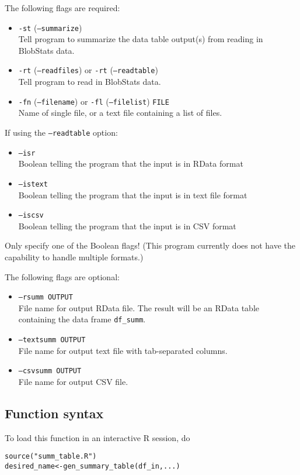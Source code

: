 \documentclass{article}
\begin{document}
The following flags are required:
\begin{itemize}
\item[] \texttt{-st} (\texttt{--summarize})\\ Tell program to summarize the data table output(s) from reading in BlobStats data.
\item[] \texttt{-rt}  (\texttt{--readfiles}) or \texttt{-rt} (\texttt{--readtable})\\ Tell program to read in BlobStats data.
\item[]\texttt{-fn} (\texttt{--filename}) or \texttt{-fl} (\texttt{--filelist}) \texttt{FILE}\\ Name of single file, or a text file containing a list of files.
\end{itemize}

If using the \texttt{--readtable} option:\begin{itemize}
\item[]\texttt{--isr}\\Boolean telling the program that the input is in RData format
\item[]\texttt{--istext}\\Boolean telling the program that the input is in text file format
\item[] \texttt{--iscsv}\\Boolean telling the program that the input is in CSV format
\end{itemize}

Only specify one of the Boolean flags! (This program currently does not have the capability to handle multiple formats.)

The following flags are optional:
\begin{itemize}
\item[] \texttt{--rsumm OUTPUT}\\ File name for output RData file. The result will be an RData table containing the data frame \texttt{df\_summ}.
\item[] \texttt{--textsumm OUTPUT}\\ File name for output text file with tab-separated columns.
\item[] \texttt{--csvsumm OUTPUT}\\File name for output CSV file. 
\end{itemize}

\subsection{Function syntax}
To load this function in an interactive R session, do
\begin{verbatim}
source("summ_table.R")
desired_name<-gen_summary_table(df_in,...)
\end{verbatim}
\end{document}
